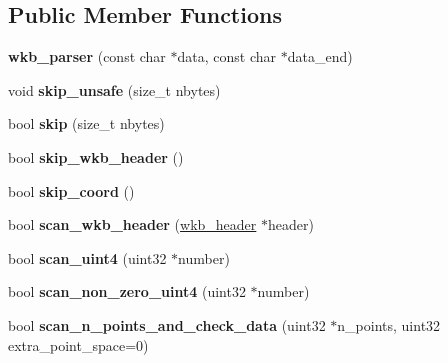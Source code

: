 \subsection*{Public Member Functions}
\begin{DoxyCompactItemize}
\item 
\mbox{\label{classGeometry_1_1wkb__parser_a541bfce0aee13fd0f4a676c59dc97ff3}} 
{\bfseries wkb\+\_\+parser} (const char $\ast$data, const char $\ast$data\+\_\+end)
\item 
\mbox{\label{classGeometry_1_1wkb__parser_a9f3471f7b383f08f9dbef58555a2c908}} 
void {\bfseries skip\+\_\+unsafe} (size\+\_\+t nbytes)
\item 
\mbox{\label{classGeometry_1_1wkb__parser_a4c0dd9cc2e45b4c155d17b1b1c99b41e}} 
bool {\bfseries skip} (size\+\_\+t nbytes)
\item 
\mbox{\label{classGeometry_1_1wkb__parser_a816ff87f1ea168a46c0079b43d93c1df}} 
bool {\bfseries skip\+\_\+wkb\+\_\+header} ()
\item 
\mbox{\label{classGeometry_1_1wkb__parser_a4ffa1ceb8397f12f1721959b2d16e16b}} 
bool {\bfseries skip\+\_\+coord} ()
\item 
\mbox{\label{classGeometry_1_1wkb__parser_a061e5e6333596e2f27b8133222716f45}} 
bool {\bfseries scan\+\_\+wkb\+\_\+header} (\mbox{\hyperlink{structwkb__header__st}{wkb\+\_\+header}} $\ast$header)
\item 
\mbox{\label{classGeometry_1_1wkb__parser_ac27d71027e211415843832cb700611b7}} 
bool {\bfseries scan\+\_\+uint4} (uint32 $\ast$number)
\item 
\mbox{\label{classGeometry_1_1wkb__parser_a489a710ce822ddd7e6c41b92029cbdca}} 
bool {\bfseries scan\+\_\+non\+\_\+zero\+\_\+uint4} (uint32 $\ast$number)
\item 
\mbox{\label{classGeometry_1_1wkb__parser_a4f2a01d0aeb9fa459c46aee14012f544}} 
bool {\bfseries scan\+\_\+n\+\_\+points\+\_\+and\+\_\+check\+\_\+data} (uint32 $\ast$n\+\_\+points, uint32 extra\+\_\+point\+\_\+space=0)

\end{DoxyCompactItemize}
